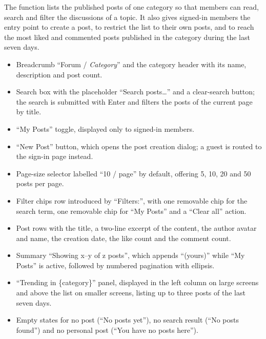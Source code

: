 \noindent The function lists the published posts of one category so that members can read,
search and filter the discussions of a topic. It also gives signed-in members the entry point
to create a post, to restrict the list to their own posts, and to reach the most liked and
commented posts published in the category during the last seven days.

\begin{itemize}[leftmargin=1.6em,topsep=3pt,itemsep=2pt,parsep=0pt,label=$\bullet$]
      \item Breadcrumb ``Forum / \textit{Category}'' and the category header with its name,
            description and post count.
      \item Search box with the placeholder ``Search posts\ldots'' and a clear-search
            button; the search is submitted with Enter and filters the posts of the current
            page by title.
      \item ``My Posts'' toggle, displayed only to signed-in members.
      \item ``New Post'' button, which opens the post creation dialog; a guest is routed to the
            sign-in page instead.
      \item Page-size selector labelled ``10 / page'' by default, offering 5, 10, 20 and 50
            posts per page.
      \item Filter chips row introduced by ``Filters:'', with one removable chip for the
            search term, one removable chip for ``My Posts'' and a ``Clear all'' action.
      \item Post rows with the title, a two-line excerpt of the content, the author avatar
            and name, the creation date, the like count and the comment count.
      \item Summary ``Showing x--y of z posts'', which appends ``(yours)'' while ``My
            Posts'' is active, followed by numbered pagination with ellipsis.
      \item ``Trending in \{category\}'' panel, displayed in the left column on large screens and
            above the list on smaller screens, listing up to three posts of the last seven days.
      \item Empty states for no post (``No posts yet''), no search result (``No posts
            found'') and no personal post (``You have no posts here'').
\end{itemize}

